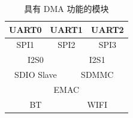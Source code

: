 
\begin{table}[H]
    \centering
    \caption{具有 DMA 功能的模块}
    \label{table:Module_with_DMA}
 \begin{tabular}{|*{6}{c|}}

    \hline
    \multicolumn{2}{|c|}{UART0} & \multicolumn{2}{c|}{UART1} & \multicolumn{2}{c|}{UART2} \\
    \hline
    \hline
    \multicolumn{2}{|c|}{SPI1} & \multicolumn{2}{c|}{SPI2} & \multicolumn{2}{c|}{SPI3} \\
    \hline
    \hline
    \multicolumn{3}{|c|}{I2S0} & \multicolumn{3}{c|}{I2S1} \\
    \hline
    \hline
    \multicolumn{3}{|c|}{SDIO Slave} & \multicolumn{3}{c|}{SDMMC} \\
    \hline
    \hline
    \multicolumn{6}{|c|}{EMAC} \\
    \hline
    \hline
    \multicolumn{3}{|c|}{BT} & \multicolumn{3}{c|}{WIFI} \\
    \hline
\end{tabular}
\end{table}
